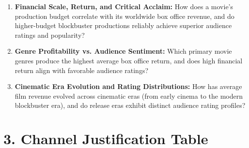 \documentclass[10pt,a4paper]{article}
\begin{document}
\begin{enumerate}\setlength{\itemsep}{1.5pt}\setlength{\parskip}{0pt}\setlength{\parsep}{0pt}
    \item[\textbf{RQ1:}] \textbf{Financial Scale, Return, and Critical Acclaim:} How does a movie's production budget correlate with its worldwide box office revenue, and do higher-budget blockbuster productions reliably achieve superior audience ratings and popularity?
    \item[\textbf{RQ2:}] \textbf{Genre Profitability vs. Audience Sentiment:} Which primary movie genres produce the highest average box office return, and does high financial return align with favorable audience ratings?
    \item[\textbf{RQ3:}] \textbf{Cinematic Era Evolution and Rating Distributions:} How has average film revenue evolved across cinematic eras (from early cinema to the modern blockbuster era), and do release eras exhibit distinct audience rating profiles?
\end{enumerate}

\section*{3. Channel Justification Table}
\end{document}
